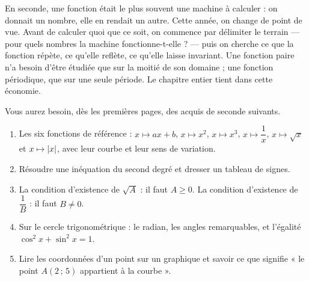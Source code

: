 
\label{t11s-c01}

En seconde, une fonction était le plus souvent une machine à calculer : on
donnait un nombre, elle en rendait un autre. Cette année, on change de point
de vue. Avant de calculer quoi que ce soit, on commence par délimiter le
terrain — pour quels nombres la machine fonctionne-t-elle ? — puis on cherche
ce que la fonction répète, ce qu'elle reflète, ce qu'elle laisse invariant.
Une fonction paire n'a besoin d'être étudiée que sur la moitié de son
domaine ; une fonction périodique, que sur une seule période. Le chapitre
entier tient dans cette économie.

\begin{revision}
Vous aurez besoin, dès les premières pages, des acquis de seconde suivants.

\begin{enumerate}[label=\textbf{\arabic*.}, leftmargin=1.5em, itemsep=0.25em]
  \item Les six fonctions de référence : $x \mapsto ax+b$, $x \mapsto x^{2}$,
        $x \mapsto x^{3}$, $x \mapsto \dfrac{1}{x}$, $x \mapsto \sqrt{x}$ et
        $x \mapsto \left|x\right|$, avec leur courbe et leur sens de variation.
  \item Résoudre une inéquation du second degré et dresser un tableau de
        signes.
  \item La condition d'existence de $\sqrt{A}$ : il faut $A \geq 0$. La
        condition d'existence de $\dfrac{1}{B}$ : il faut $B \neq 0$.
  \item Sur le cercle trigonométrique : le radian, les angles remarquables,
        et l'égalité $\cos^{2}x + \sin^{2}x = 1$.
  \item Lire les coordonnées d'un point sur un graphique et savoir ce que
        signifie « le point $A(2\,;\,5)$ appartient à la courbe ».
\end{enumerate}
\end{revision}

